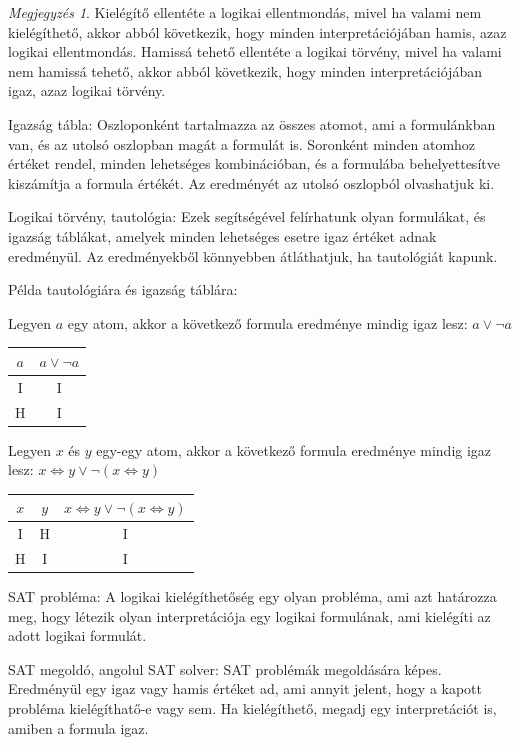 \documentclass[
]{thesis-ekf}
\theoremstyle{definition}
\theoremstyle{remark}
\newtheorem{megjegyzes}[tetel]{Megjegyzés}
\begin{document}
\begin{megjegyzes}
	Kielégítő ellentéte a logikai ellentmondás, mivel ha valami nem kielégíthető, akkor abból következik, hogy minden interpretációjában hamis, azaz logikai ellentmondás.
	Hamissá tehető ellentéte a logikai törvény, mivel ha valami nem hamissá tehető, akkor abból következik, hogy minden interpretációjában igaz, azaz logikai törvény.
\end{megjegyzes}

Igazság tábla: Oszloponként tartalmazza az összes atomot, ami a formulánkban van, és az utolsó oszlopban magát a formulát is. Soronként minden atomhoz értéket rendel, minden lehetséges kombinációban, és a formulába behelyettesítve kiszámítja a formula értékét. Az eredményét az utolsó oszlopból olvashatjuk ki.

Logikai törvény, tautológia: Ezek segítségével felírhatunk olyan formulákat, és igazság táblákat, amelyek minden lehetséges esetre igaz értéket adnak eredményül. Az eredményekből könnyebben átláthatjuk, ha tautológiát kapunk.

\label{pelda-tautologia}
	Példa tautológiára és igazság táblára: 
		
	Legyen $ a $ egy atom, akkor a következő formula eredménye mindig igaz lesz: $ a\vee\neg a $
	
	\begin{tabular}{|c|c|}
		\hline
		$ a $ & $ a\vee\neg a $ \\
		\hline
		I & I \\
		\hline
		H & I \\
		\hline
	\end{tabular}

	Legyen $ x $ és $ y $ egy-egy atom, akkor a következő formula eredménye mindig igaz lesz: $ x \Leftrightarrow y\vee \neg(x\Leftrightarrow y) $
	
	\begin{tabular}{|c|c|c|}
		\hline
		$ x $ & $ y $ & $ x\Leftrightarrow y\vee\neg(x\Leftrightarrow y) $ \\
		\hline
		I & H & I \\
		\hline
		H & I & I \\
		\hline
	\end{tabular}

\textsc{SAT} probléma: A logikai kielégíthetőség egy olyan probléma, ami azt határozza meg, hogy létezik olyan interpretációja egy logikai formulának, ami kielégíti az adott logikai formulát.

\textsc{SAT} megoldó, angolul \textsc{SAT} solver: \textsc{SAT} problémák megoldására képes. Eredményül egy igaz vagy hamis értéket ad, ami annyit jelent, hogy a kapott probléma kielégíthatő-e vagy sem. Ha kielégíthető, megadj egy interpretációt is, amiben a formula igaz.
\end{document}
